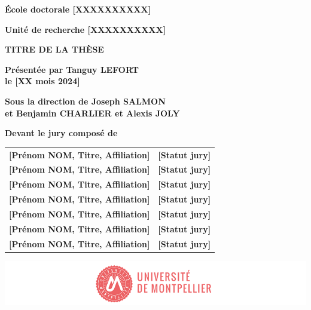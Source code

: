 \documentclass[
a4paper, %
12pt]{book}
\begin{document}
\begin{titlepage}
{\bigskip
\textbf{École doctorale [XXXXXXXXXX]}

\bigskip
\textbf{Unité de recherche [XXXXXXXXXX]}


\color{Titleblue}
\fontsize{17}{20.4}\selectfont
\vspace{2cm}
\textbf{TITRE DE LA THÈSE}


\vspace{4cm}
\fontsize{15}{18}\selectfont
\color{black}
\textbf{Présentée par Tanguy LEFORT\\
le [XX mois 2024]}

\bigskip
\fontsize{13}{15.6}\selectfont
\textbf{Sous la direction de Joseph SALMON\\
et Benjamin CHARLIER et Alexis JOLY }

\vspace{1.5cm}
\normalsize
\textbf{Devant le jury composé de}\\
\bigskip
\fontsize{10}{12}\selectfont
\vspace{1.5mm}
\begin{tabular}{p{14cm}l}
\textbf{[Prénom NOM, Titre, Affiliation]} & \textbf{[Statut jury]} \\
\textbf{[Prénom NOM, Titre, Affiliation]} & \textbf{[Statut jury]} \\
\textbf{[Prénom NOM, Titre, Affiliation]} & \textbf{[Statut jury]} \\
\textbf{[Prénom NOM, Titre, Affiliation]} & \textbf{[Statut jury]} \\
\textbf{[Prénom NOM, Titre, Affiliation]} & \textbf{[Statut jury]} \\
\textbf{[Prénom NOM, Titre, Affiliation]} & \textbf{[Statut jury]} \\
\textbf{[Prénom NOM, Titre, Affiliation]} & \textbf{[Statut jury]} \\
\end{tabular}

\vspace{\fill}
\includegraphics[scale=1]{images/PhD_Couverture_LogoUM.png}
\vspace{-15mm}}
\end{titlepage}


% 
\end{document}

